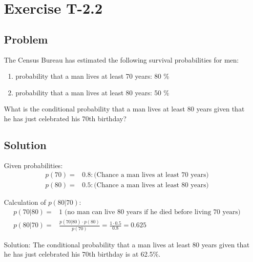 \section*{Exercise T-2.2}

\subsection*{Problem}
The Census Bureau has estimated the following survival probabilities for men:
\begin{enumerate}
	\item probability that a man lives at least 70 years: 80 \%
	\item probability that a man lives at least 80 years: 50 \%
\end{enumerate}

What is the conditional probability that a man lives at least 80 years given that he has just celebrated his 70th birthday?

\subsection*{Solution}

Given probabilities:
\begin{align}
	p(70) =& 0.8: \text{(Chance a man lives at least 70 years)} \nonumber \\
	p(80) =& 0.5: \text{(Chance a man lives at least 80 years)} \nonumber
\end{align}

Calculation of $p(80|70)$:
\begin{align}
	p(70|80) =& 1 \text{ (no man can live 80 years if he died before living 70 years)} \nonumber \\
	p(80|70) =& \frac{p(70|80)\cdot p(80)}{p(70)} = \frac{1\cdot 0.5}{0.8} = 0.625 \nonumber
\end{align}


Solution: The conditional probability that a man lives at least 80 years given that he has just celebrated his 70th birthday is at 62.5\%.